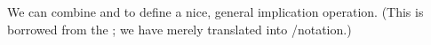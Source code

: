 \begin{code}
\begin{code}
%
\\[\AgdaEmptyExtraSkip]%
%
\>[0]\AgdaSpace{}%
\AgdaSymbol{:}\AgdaSpace{}%
\AgdaSpace{}%
\AgdaSpace{}%
\AgdaSpace{}%
\AgdaSpace{}%
\AgdaSpace{}%
\AgdaSpace{}%
\AgdaSpace{}%
\AgdaSpace{}%
\AgdaSpace{}%
\AgdaSpace{}%
\AgdaSpace{}%
\AgdaSpace{}%
\AgdaSpace{}%
\AgdaSpace{}%
\AgdaSpace{}%
\AgdaSpace{}%
\AgdaSpace{}%
\<%
\\
%
\>[0]\AgdaSpace{}%
\AgdaSpace{}%
\AgdaSpace{}%
\AgdaSymbol{=}\AgdaSpace{}%
\AgdaSpace{}%
\AgdaSymbol{\{}\AgdaSpace{}%
\AgdaSymbol{\}}\AgdaSpace{}%
\AgdaSpace{}%
\AgdaSpace{}%
\AgdaSpace{}%
\AgdaSpace{}%
\AgdaSpace{}%
\AgdaSpace{}%
\AgdaSpace{}%
\<%
\end{code}
\ccpad
We can combine  and  to define a nice, general implication operation. (This is borrowed from the \agdastdlib; we have merely translated into \typetopology/\ualib notation.)
\ccpad
\begin{code}%
\>[0]\AgdaSpace{}%
\AgdaSymbol{:}\AgdaSpace{}%

\end{code}
\end{code}
